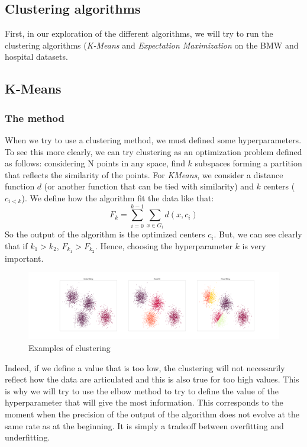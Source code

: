 \documentclass[15pt]{article}
\begin{document}
\begin{multicols}{2}
\section{Clustering algorithms}

First, in our exploration of the different algorithms, we will try to run the clustering algorithms (\textit{K-Means} and \textit{Expectation Maximization} on the BMW and hospital datasets.

\subsection{K-Means}

\subsubsection{The method}

When we try to use a clustering method, we must defined some hyperparameters. To see this more clearly, we can try clustering as an optimization problem defined as follows: considering N points in any space, find $k$ subspaces forming a partition that reflects the similarity of the points.
For \textit{KMeans}, we consider a distance function $d$ (or another function that can be tied with similarity) and $k$ centers ($c_{i<k}$). We define how the algorithm fit the data like that:
$$ F_k = \sum_{i=0}^{k-1} \sum_{x\in G_i} d(x, c_i) $$
So the output of the algorithm is the optimized centers $c_i$. But, we can see clearly that if $k_1>k_2$, $F_{k_1}>F_{k_2}$. Hence, choosing the hyperparameter $k$ is very important.

\begin{figure}[H]
\centering
\includegraphics[width = \columnwidth]{blob.png}
\caption{Examples of clustering}
\end{figure}

Indeed, if we define a value that is too low, the clustering will not necessarily reflect how the data are articulated and this is also true for too high values. 
This is why we will try to use the elbow method to try to define the value of the hyperparameter that will give the most information. This corresponds to the moment when the precision of the output of the algorithm does not evolve at the same rate as at the beginning. It is simply a tradeoff between overfitting and underfitting.


\end{multicols}
\end{document}
